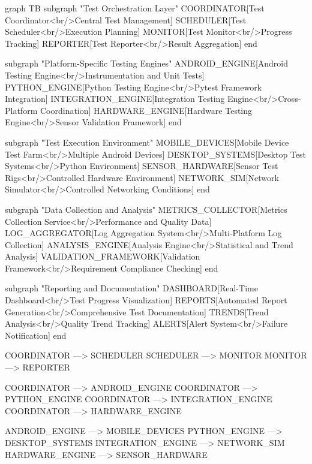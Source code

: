     graph TB
        subgraph "Test Orchestration Layer"
            COORDINATOR[Test Coordinator<br/>Central Test Management]
            SCHEDULER[Test Scheduler<br/>Execution Planning]
            MONITOR[Test Monitor<br/>Progress Tracking]
            REPORTER[Test Reporter<br/>Result Aggregation]
        end

        subgraph "Platform-Specific Testing Engines"
            ANDROID_ENGINE[Android Testing Engine<br/>Instrumentation and Unit Tests]
            PYTHON_ENGINE[Python Testing Engine<br/>Pytest Framework Integration]
            INTEGRATION_ENGINE[Integration Testing Engine<br/>Cross-Platform Coordination]
            HARDWARE_ENGINE[Hardware Testing Engine<br/>Sensor Validation Framework]
        end

        subgraph "Test Execution Environment"
            MOBILE_DEVICES[Mobile Device Test Farm<br/>Multiple Android Devices]
            DESKTOP_SYSTEMS[Desktop Test Systems<br/>Python Environment]
            SENSOR_HARDWARE[Sensor Test Rigs<br/>Controlled Hardware Environment]
            NETWORK_SIM[Network Simulator<br/>Controlled Networking Conditions]
        end

        subgraph "Data Collection and Analysis"
            METRICS_COLLECTOR[Metrics Collection Service<br/>Performance and Quality Data]
            LOG_AGGREGATOR[Log Aggregation System<br/>Multi-Platform Log Collection]
            ANALYSIS_ENGINE[Analysis Engine<br/>Statistical and Trend Analysis]
            VALIDATION_FRAMEWORK[Validation Framework<br/>Requirement Compliance Checking]
        end

        subgraph "Reporting and Documentation"
            DASHBOARD[Real-Time Dashboard<br/>Test Progress Visualization]
            REPORTS[Automated Report Generation<br/>Comprehensive Test Documentation]
            TRENDS[Trend Analysis<br/>Quality Trend Tracking]
            ALERTS[Alert System<br/>Failure Notification]
        end

        COORDINATOR ---> SCHEDULER
        SCHEDULER ---> MONITOR
        MONITOR ---> REPORTER

        COORDINATOR ---> ANDROID_ENGINE
        COORDINATOR ---> PYTHON_ENGINE
        COORDINATOR ---> INTEGRATION_ENGINE
        COORDINATOR ---> HARDWARE_ENGINE

        ANDROID_ENGINE ---> MOBILE_DEVICES
        PYTHON_ENGINE ---> DESKTOP_SYSTEMS
        INTEGRATION_ENGINE ---> NETWORK_SIM
        HARDWARE_ENGINE ---> SENSOR_HARDWARE

